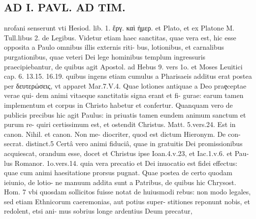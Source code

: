 \documentclass{article}
\begin{document}
\begin{pages}
\section*{AD I. PAVL. AD TIM. }
\marginpar{[ p.66 ]}\pstart nrofani senserunt vti Hesiod. lib. 1. ἔργ. καὶ ἠμερ. et Plato, et ex Platone M. Tull.libus 2. de Legibus. Videtur etiam haec sanctitas, quae vera est, hic esse opposita a Paulo omnibus illis externis riti- bus, lotionibus, et carnalibus purgationibus, quae veteri Dei lege hominibus templum ingressuris praecipiebantur, de quibus agit Apostol. ad Hebus  9. vers 1o. et Moses Leuitici cap. 6. 13.15. 16.19. quibus ingens etiam cumulus a Pharisaeis additus erat postea per δευτερώσεις, vt apparet Mar.7.V.4. Quae lotìones antiquae a Deo praȩceptae verae qui- dem animi vitaeque sanctitatis signa erant et fi- gurae: earum tamen implementum et corpus in Christo habetur et confertur. Quanquam vero de publicis precibus hic agit Paulus: in priuatis tamen eundem animum sanctum et purum re- quiri certissimum est, et ostendit Christus. Matt. 5.vers.24. Est in canon. Nihil. et canon. Non me- diocriter, quod est dictum Hieronym. De con- secrat. distinct.5 Certâ vero animi fiduciâ, quae in gratuitis Dei promissionibus acquiescat, orandum esse, docet et Christus ipse Ioan.4.v.23, et Iac.1.v.6. et Pau- lus Romanor. 1o.vers.14. quia vera precatio et Dei inuocatio est fidei effectus: quae cum animi haesitatione prorsus pugnat. Quae postea de certo quodam ieiunio, de lotio- ne manuum addita sunt a Patribus, de quibus hic Chrysost. Hom. 7 vbi quosdam sollicitos fuisse notat de huiusmodi rebus: non modo legales, sed etiam Ethnicorum caeremonias, aut potius super- stitiones reponunt nobis, et redolent, etsi ani- mus sobrius longe ardentius Deum precatur,  \pend

\end{pages}
\end{document}
